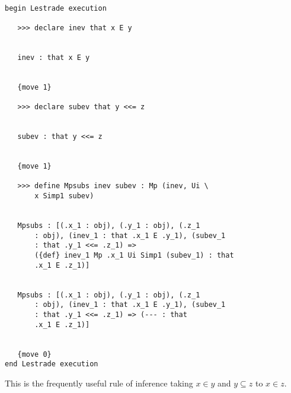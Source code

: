 \documentclass[12pt]{article}
\begin{document}
\begin{verbatim}

begin Lestrade execution

   >>> declare inev that x E y


   inev : that x E y


   {move 1}

   >>> declare subev that y <<= z


   subev : that y <<= z


   {move 1}

   >>> define Mpsubs inev subev : Mp (inev, Ui \
       x Simp1 subev)


   Mpsubs : [(.x_1 : obj), (.y_1 : obj), (.z_1 
       : obj), (inev_1 : that .x_1 E .y_1), (subev_1 
       : that .y_1 <<= .z_1) => 
       ({def} inev_1 Mp .x_1 Ui Simp1 (subev_1) : that 
       .x_1 E .z_1)]


   Mpsubs : [(.x_1 : obj), (.y_1 : obj), (.z_1 
       : obj), (inev_1 : that .x_1 E .y_1), (subev_1 
       : that .y_1 <<= .z_1) => (--- : that 
       .x_1 E .z_1)]


   {move 0}
end Lestrade execution
\end{verbatim}

This is the frequently useful rule of inference taking $x \in y$ and $y \subseteq z$ to $x \in z$.
\end{document}
